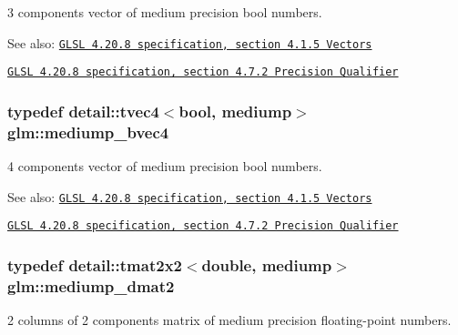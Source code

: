 3 components vector of medium precision bool numbers.

\begin{Desc}
\item[See also:]\href{http://www.opengl.org/registry/doc/GLSLangSpec.4.20.8.pdf}{\tt GLSL 4.20.8 specification, section 4.1.5 Vectors} 

\href{http://www.opengl.org/registry/doc/GLSLangSpec.4.20.8.pdf}{\tt GLSL 4.20.8 specification, section 4.7.2 Precision Qualifier} \end{Desc}
\hypertarget{group__core__precision_g8bb7cfe902e2cb356450d211ca4d58e2}{
\subsubsection[mediump\_\-bvec4]{\setlength{\rightskip}{0pt plus 5cm}typedef detail::tvec4$<$bool, mediump$>$ {\bf glm::mediump\_\-bvec4}}}
\label{group__core__precision_g8bb7cfe902e2cb356450d211ca4d58e2}


4 components vector of medium precision bool numbers.

\begin{Desc}
\item[See also:]\href{http://www.opengl.org/registry/doc/GLSLangSpec.4.20.8.pdf}{\tt GLSL 4.20.8 specification, section 4.1.5 Vectors} 

\href{http://www.opengl.org/registry/doc/GLSLangSpec.4.20.8.pdf}{\tt GLSL 4.20.8 specification, section 4.7.2 Precision Qualifier} \end{Desc}
\hypertarget{group__core__precision_gc056ec9d1c37e591172544088163b7e4}{
\subsubsection[mediump\_\-dmat2]{\setlength{\rightskip}{0pt plus 5cm}typedef detail::tmat2x2$<$double, mediump$>$ {\bf glm::mediump\_\-dmat2}}}
\label{group__core__precision_gc056ec9d1c37e591172544088163b7e4}


2 columns of 2 components matrix of medium precision floating-point numbers.

